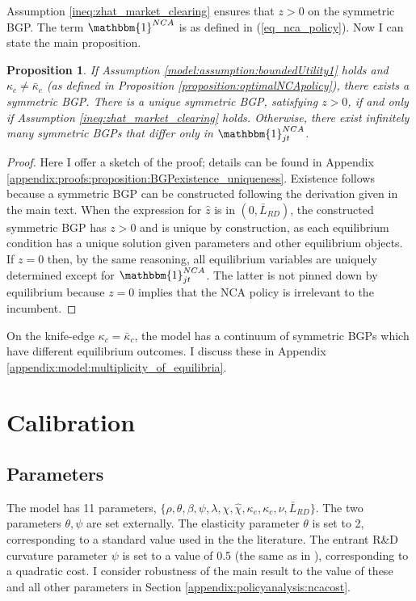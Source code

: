 \documentclass[11pt,english]{article}
\newtheorem{proposition}{Proposition}
\theoremstyle{definition}
\begin{document}
Assumption \ref{ineq:zhat_market_clearing} ensures that $z > 0$ on the symmetric BGP. The term $\mathbbm{1}^{NCA}$ is as defined in (\ref{eq_nca_policy}). Now I can state the main proposition.

\begin{proposition}\label{proposition:BGPexistence_uniqueness}
	If Assumption \ref{model:assumption:boundedUtility1} holds and $\kappa_c \ne \bar{\kappa}_c$ (as defined in Proposition \ref{proposition:optimalNCApolicy}), there exists a symmetric BGP. There is a unique symmetric BGP, satisfying $z > 0$, if and only if Assumption \ref{ineq:zhat_market_clearing} holds. Otherwise, there exist infinitely many symmetric BGPs that differ only in $\mathbbm{1}^{NCA}_{jt}$.
\end{proposition}

\begin{proof}
	Here I offer a sketch of the proof; details can be found in Appendix \ref{appendix:proofs:proposition:BGPexistence_uniqueness}. Existence follows because a symmetric BGP can be constructed following the derivation given in the main text. When the expression for $\hat{z}$ is in $(0,\bar{L}_{RD})$, the constructed symmetric BGP has $z > 0$ and is unique by construction, as each equilibrium condition has a unique solution given parameters and other equilibrium objects. If $z = 0$ then, by the same reasoning, all equilibrium variables are uniquely determined except for $\mathbbm{1}^{NCA}_{jt}$. The latter is not pinned down by equilibrium because $z = 0$ implies that the NCA policy is irrelevant to the incumbent.
\end{proof}

On the knife-edge $\kappa_c = \bar{\kappa}_c$, the model has a continuum of symmetric BGPs which have different equilibrium outcomes. I discuss these in Appendix \ref{appendix:model:multiplicity_of_equilibria}.

\section{Calibration}\label{sec:calibration}

\subsection{Parameters}

The model has 11 parameters, $\{\rho, \theta, \beta, \psi, \lambda, \chi, \hat{\chi}, \kappa_e, \kappa_c, \nu, \bar{L}_{RD}\}$. The two parameters $\theta, \psi$ are set externally. The elasticity parameter $\theta$ is set to 2, corresponding to a standard value used in the the literature. The entrant R\&D curvature parameter $\psi$ is set to a value of 0.5 (the same as in \cite{acemoglu_innovation_2015}), corresponding to a quadratic cost. I consider robustness of the main result to the value of these and all other parameters in Section \ref{appendix:policyanalysis:ncacost}.
\end{document}
